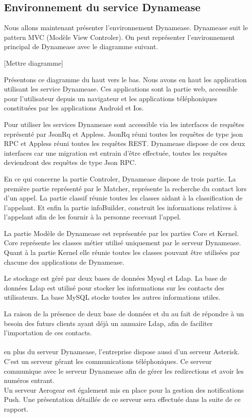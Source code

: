 \subsection{Environnement du service Dynamease}

Nous allons maintenant présenter l'environnement Dynamease. Dynamease suit le pattern MVC (Modèle View Controler). On peut représenter l'environnement principal de Dynamease avec le diagramme suivant.

[Mettre diagramme]

Présentons ce diagramme du haut vers le bas. Nous avons en haut les application utilisant les service Dynamease. Ces applications sont la partie web, accessible pour l'utilisateur depuis un navigateur et les applications téléphoniques constituées par les applications Android et Ios.

Pour utiliser les services Dynamease sont accessible via les interfaces de requêtes représenté par JsonRq et Appless. JsonRq réuni toutes les requêtes de type json RPC et Appless réuni toutes les requêtes REST. Dynamease dispose de ces deux interfaces car une migration est entrain d'être effectuée, toutes les requêtes deviendront des requêtes de type Json RPC.

En ce qui concerne la partie Controler, Dynamease dispose de trois partie. La première partie représenté par le Matcher, représente la recherche du contact lors d'un appel. La partie classif réunie toutes les classes aidant à la classification de l'appelant. Et enfin la partie infoBuilder, construit les informations relatives à l'appelant afin de les fournir à la personne recevant l'appel.

La partie Modèle de Dynamease est représentée par les parties Core et Kernel. Core représente les classes métier utilisé uniquement par le serveur Dynamease. Quant à la partie Kernel elle réunie toutes les classes pouvant être utilisées par chacune des applications de Dynamease.

Le stockage est géré par deux bases de données Mysql et Ldap. La base de données Ldap est utilisé pour stocker les informations sur les contacts des utilisateurs. La base MySQL stocke toutes les autres informations utiles.

La raison de la présence de deux base de données et du au fait de répondre à un besoin des futurs clients ayant déjà un annuaire Ldap, afin de faciliter l'importation de ces contacts.\\\\

en plus du serveur Dynamease, l'entreprise dispose aussi d'un serveur Asterisk. C'est un serveur gérant les communications téléphoniques. Ce serveur communique avec le serveur Dynamease afin de gérer les redirections et avoir les numéros entrant.\\

Un serveur Aerogear est également mis en place pour la gestion des notifications Push. Une présentation détaillée de ce serveur sera effectuée dans la suite de ce rapport.